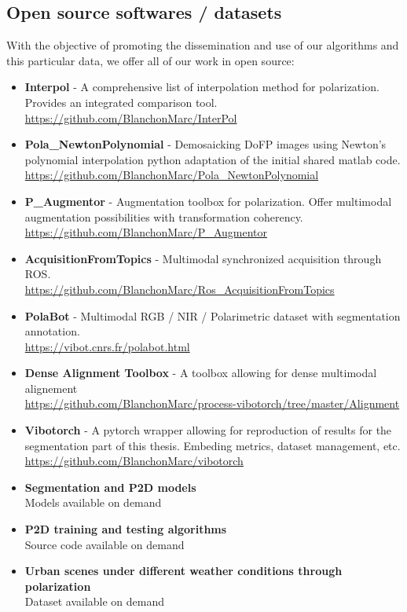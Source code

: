 \subsection{Open source softwares / datasets}
With the objective of promoting the dissemination and use of our algorithms and this particular data, we offer all of our work in open source:

\begin{itemize}
	\item \textbf{Interpol} - A comprehensive list of interpolation method for polarization. Provides an integrated comparison tool.\\
	\url{https://github.com/BlanchonMarc/InterPol}
	\item \textbf{Pola\_NewtonPolynomial} - Demosaicking DoFP images using Newton's polynomial interpolation python adaptation of the initial shared matlab code.\\
	\url{https://github.com/BlanchonMarc/Pola_NewtonPolynomial}
	\item \textbf{P\_Augmentor} - Augmentation toolbox for polarization. Offer multimodal augmentation possibilities with transformation coherency.\\
	\url{https://github.com/BlanchonMarc/P_Augmentor}
	\item \textbf{AcquisitionFromTopics} - Multimodal synchronized acquisition through ROS.\\
	\url{https://github.com/BlanchonMarc/Ros_AcquisitionFromTopics}
	\item \textbf{PolaBot} - Multimodal RGB / NIR / Polarimetric dataset with segmentation annotation.\\
	\url{https://vibot.cnrs.fr/polabot.html}
	\item \textbf{Dense Alignment Toolbox} - A toolbox allowing for dense multimodal alignement \\
	\url{https://github.com/BlanchonMarc/process-vibotorch/tree/master/Alignment}
	\item \textbf{Vibotorch} - A pytorch wrapper allowing for reproduction of results for the segmentation part of this thesis. Embeding metrics, dataset management, etc.\\
	\url{https://github.com/BlanchonMarc/vibotorch}
	\item \textbf{Segmentation and P2D models} \\
	Models available on demand
	\item \textbf{P2D training and testing algorithms} \\
	Source code available on demand
	\item \textbf{Urban scenes under different weather conditions through polarization} \\
	Dataset available on demand
\end{itemize}


